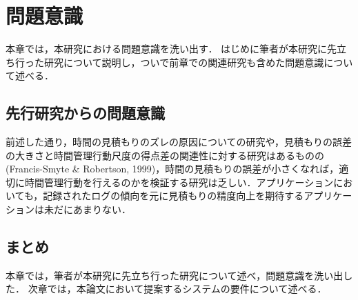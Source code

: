 \chapter{問題意識}
本章では，本研究における問題意識を洗い出す．
はじめに筆者が本研究に先立ち行った研究について説明し，ついで前章での関連研究も含めた問題意識について述べる．

\section{先行研究からの問題意識}
前述した通り，時間の見積もりのズレの原因についての研究や，見積もりの誤差の大きさと時間管理行動尺度の得点差の関連性に対する研究はあるものの(Francis-Smyte \& Robertson, 1999)，時間の見積もりの誤差が小さくなれば，適切に時間管理行動を行えるのかを検証する研究は乏しい．アプリケーションにおいても，記録されたログの傾向を元に見積もりの精度向上を期待するアプリケーションは未だにあまりない．

\section{まとめ}
本章では，筆者が本研究に先立ち行った研究について述べ，問題意識を洗い出した．
次章では，本論文において提案するシステムの要件について述べる．